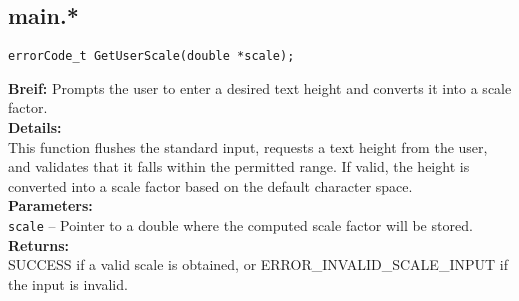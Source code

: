 
\subsection{main.*}



\begin{verbatim}
errorCode_t GetUserScale(double *scale);
\end{verbatim}
\textbf{Breif:} Prompts the user to enter a desired text height and converts it into a scale factor. \\
\textbf{Details:} \\
\hspace*{1cm}This function flushes the standard input, requests a text height from the user, and validates that it falls within the permitted range. If valid, the height is converted into a scale factor based on the default character space. \\
\textbf{Parameters:} \\
\hspace*{1cm}\texttt{scale} -- Pointer to a double where the computed scale factor will be stored. \\
\textbf{Returns:} \\
\hspace*{1cm}SUCCESS if a valid scale is obtained, or ERROR\_INVALID\_SCALE\_INPUT if the input is invalid. \\[1em]

